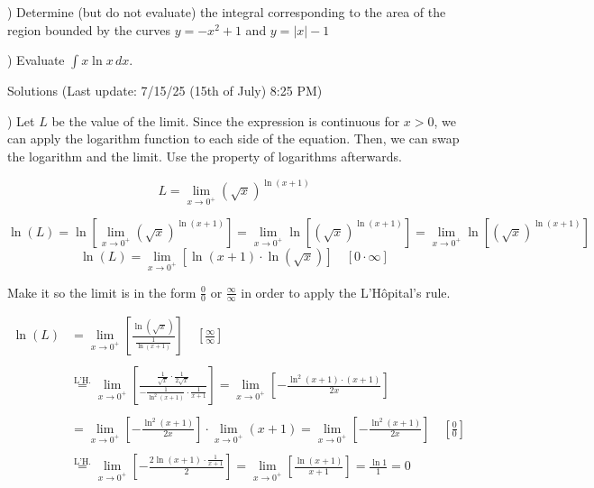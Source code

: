 \documentclass{article}
\begin{document}
) Determine (but do not evaluate) the integral corresponding to the area of the region bounded by the curves $y = -x^2 + 1$ and $y = |x|- 1$

\hfill

) Evaluate $\displaystyle \int x\ln x \, dx$.

\hfill

\newpage

\begin{center}
Solutions (Last update: 7/15/25 (15th of July) 8:25 PM)
\end{center}

) Let $L$ be the value of the limit. Since the expression is continuous for $x>0$, we can apply the logarithm function to each side of the equation. Then, we can swap the logarithm and the limit. Use the property of logarithms afterwards.

\begin{equation*}L=\lim_{x\to0^+} \left(\sqrt x\right)^{\ln\left(x+1\right)}\end{equation*}

\begin{equation*}\ln(L)=\ln\left[\lim_{x\to0^+} \left(\sqrt x\right)^{\ln\left(x+1\right)}\right] = \lim_{x\to0^+} \ln\left[\left(\sqrt x\right)^{\ln\left(x+1\right)}\right] = \lim_{x\to0^+} \ln\left[\left(\sqrt x\right)^{\ln\left(x+1\right)}\right] \end{equation*}
\begin{equation*}\ln\left(L\right) = \lim_{x\to0^+} \left[\ln\left(x+1\right)\cdot\ln\left(\sqrt x\right)\right] \quad\left[0\cdot\infty\right]\end{equation*}

\hfill

\noindent Make it so the limit is in the form $\displaystyle \frac00$ or $\displaystyle \frac\infty\infty$ in order to apply the L'Hôpital's rule.

\begin{align*}\ln\left(L\right) &= \lim_{x\to0^+} \left[\frac{\ln\left(\sqrt x\right)}{\frac1{\ln\left(x+1\right)}}\right] \quad\left[\frac\infty\infty\right]\\\\&\overset{\text{L'H.}}{=}\lim_{x\to0^+} \left[\frac{\frac1{\sqrt x}\cdot\frac1{2\sqrt x}}{-\frac1{\ln^2\left(x+1\right)}\cdot \frac1{x+1}}\right] = \lim_{x\to0^+} \left[-\frac{\ln^2(x+1)\cdot(x+1)}{2x}\right]\\\\&=\lim_{x\to0^+} \left[-\frac{\ln^2(x+1)}{2x}\right] \cdot\lim_{x\to0^+} \left(x+1\right)=\lim_{x\to0^+} \left[-\frac{\ln^2(x+1)}{2x}\right]\quad\left[\frac00\right]\\\\&\overset{\text{L'H.}}{=}\lim_{x\to0^+} \left[-\frac{2\ln(x+1) \cdot\frac1{x+1}}2\right]=\lim_{x\to0^+} \left[\frac{\ln(x+1)}{x+1}\right] = \frac{\ln1}{1}=0\end{align*}
\end{document}
